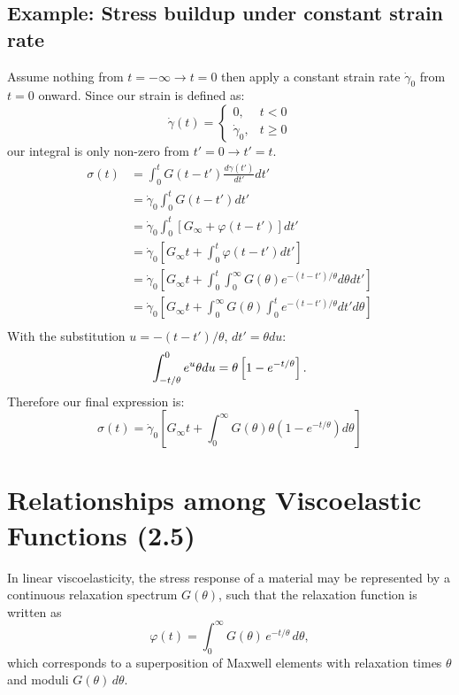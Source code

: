 \subsection{Example: Stress buildup under constant strain rate}
Assume nothing from $t=-\infty \to t=0$ then apply a constant strain rate $\dot\gamma_0$ from $t=0$ onward.
Since our strain is defined as:
\begin{equation}
	\dot\gamma(t) = \begin{cases}
		0, & t < 0 \\
		\dot\gamma_0, & t \geq 0
	\end{cases}
\end{equation}
our integral is only non-zero from $t'=0 \to t'=t$.
\begin{align*}
	\sigma(t) &= \int_0^t G(t - t') \frac{d\gamma(t')}{dt'} dt' \\
	&= \dot\gamma_0 \int_0^t G(t - t') dt' \\
	&= \dot\gamma_0 \int_0^t \left[G_\infty + \varphi(t - t')\right] dt' \\
	&= \dot\gamma_0 \left[G_\infty t + \int_0^t \varphi(t - t') dt'\right] \\
	&= \dot\gamma_0 \left[G_\infty t + \int_0^t \int_0^\infty G(\theta) e^{-(t - t')/\theta} d\theta dt'\right] \\
	&= \dot\gamma_0 \left[G_\infty t + \int_0^\infty G(\theta) \int_0^t e^{-(t - t')/\theta} dt' d\theta\right] \\
\end{align*}
With the substitution $u = - (t - t')/\theta$, $dt' = \theta du$:
\begin{equation*}
	\int_{-t/\theta}^0 e^{u} \theta du \\
	= \theta \left[ 1 - e^{-t/\theta} \right].
\end{equation*}
Therefore our final expression is:
\begin{equation}
	\sigma(t) = \dot\gamma_0 \left[G_\infty t + \int_0^\infty G(\theta) \theta (1 - e^{-t/\theta}) d\theta\right]
\end{equation}


\section{Relationships among Viscoelastic Functions (2.5)}

In linear viscoelasticity, the stress response of a material may be represented by a continuous relaxation spectrum $G(\theta)$, such that the relaxation function is written as
\begin{equation}
	\varphi(t) = \int_0^\infty G(\theta)\, e^{-t/\theta}\, d\theta,
\end{equation}
which corresponds to a superposition of Maxwell elements with relaxation times $\theta$ and moduli $G(\theta)\,d\theta$.

